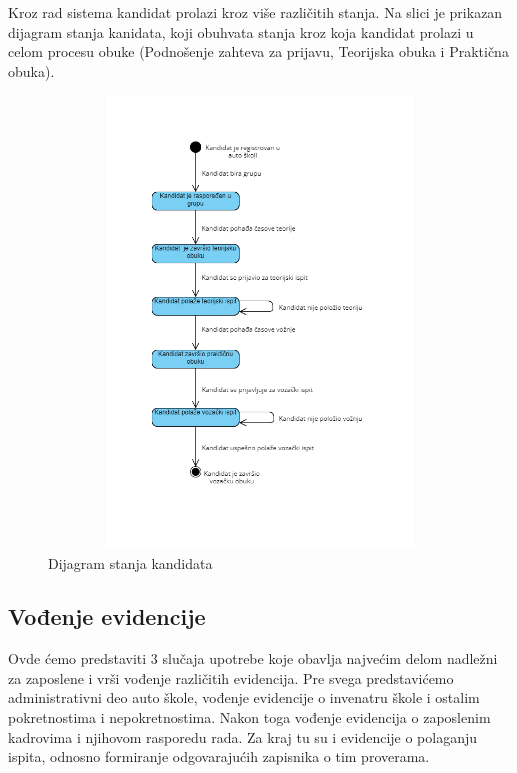Kroz rad sistema kandidat prolazi kroz više različitih stanja. Na slici  \label{fig:stanja_kandidat} je prikazan dijagram stanja kanidata, 
koji obuhvata stanja kroz koja kandidat prolazi u celom procesu obuke (Podnošenje zahteva za prijavu, Teorijska obuka i Praktična obuka).

\begin{figure}[H]
    \begin{center}
        \includegraphics[width=140mm, height=120mm]{Diagrams/dijagram_stanja_kandidata.png}
    \end{center}
    \caption {Dijagram stanja kandidata}
    \label{fig:stanja_kandidat}

\end{figure}




\subsection {Vođenje evidencije}
Ovde ćemo predstaviti 3 slučaja upotrebe koje obavlja najvećim delom  nadležni za zaposlene i vrši vođenje različitih evidencija.
Pre svega predstavićemo administrativni deo auto škole, vođenje evidencije o invenatru škole i ostalim pokretnostima i nepokretnostima.
Nakon toga vođenje evidencija o zaposlenim kadrovima i njihovom rasporedu rada. Za kraj tu su i evidencije o polaganju ispita, odnosno formiranje 
odgovarajućih zapisnika o tim proverama.


